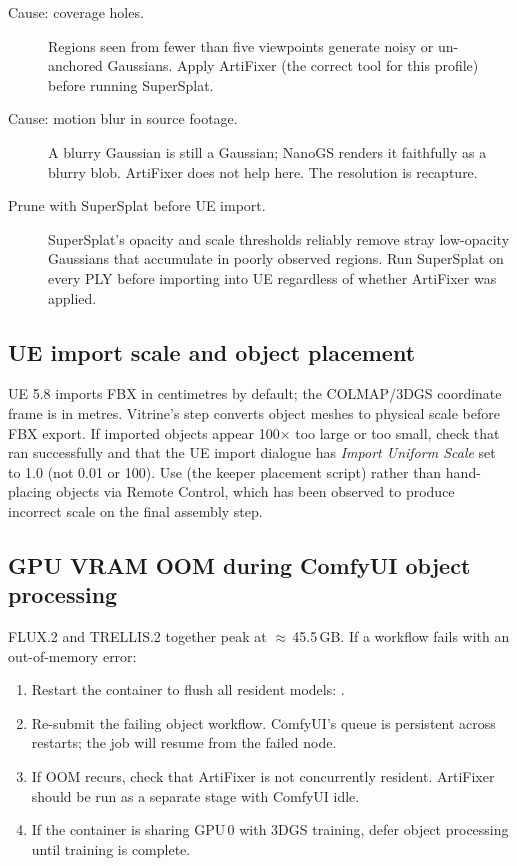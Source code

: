 \begin{description}
  \item[Cause: coverage holes.]  Regions seen from fewer than five viewpoints
    generate noisy or un-anchored Gaussians.  Apply ArtiFixer (the correct tool
    for this profile) before running SuperSplat.
  \item[Cause: motion blur in source footage.]  A blurry Gaussian is still a
    Gaussian; NanoGS renders it faithfully as a blurry blob.  ArtiFixer does
    not help here.  The resolution is recapture.
  \item[Prune with SuperSplat before UE import.] SuperSplat's opacity and scale
    thresholds reliably remove stray low-opacity Gaussians that accumulate in
    poorly observed regions.  Run SuperSplat on every PLY before importing into
    UE regardless of whether ArtiFixer was applied.
\end{description}

\subsection{UE import scale and object placement}
\label{sec:pb-ts-ue-scale}

UE 5.8 imports FBX in centimetres by default; the COLMAP/3DGS coordinate
frame is in metres.  Vitrine's  step converts
object meshes to physical scale before FBX export.  If imported objects appear
100$\times$ too large or too small, check that 
ran successfully and that the UE import dialogue has \textit{Import Uniform
Scale} set to 1.0 (not 0.01 or 100).  Use  (the
keeper placement script) rather than hand-placing objects via Remote Control,
which has been observed to produce incorrect scale on the final assembly step.

\subsection{GPU VRAM OOM during ComfyUI object processing}
\label{sec:pb-ts-vram}

FLUX.2 and TRELLIS.2 together peak at $\approx$\,45.5\,GB.  If a workflow
fails with an out-of-memory error:
\begin{enumerate}[nosep]
  \item Restart the  container to flush all resident
        models: .
  \item Re-submit the failing object workflow.  ComfyUI's queue is persistent
        across restarts; the job will resume from the failed node.
  \item If OOM recurs, check that ArtiFixer is not concurrently resident.
        ArtiFixer should be run as a separate stage with ComfyUI idle.
  \item If the  container is sharing GPU\,0 with
         3DGS training, defer object processing until
        training is complete.
\end{enumerate}

